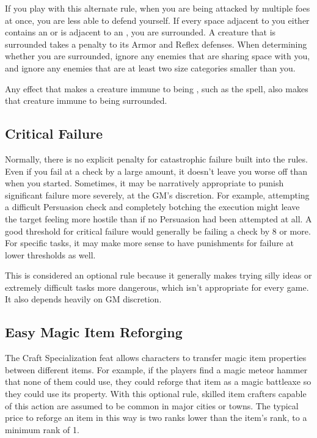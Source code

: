         If you play with this alternate rule, when you are being attacked by multiple foes at once, you are less able to defend yourself.
        If every space adjacent to you either contains an  or is adjacent to an , you are surrounded.
        A creature that is surrounded takes a  penalty to its Armor and Reflex defenses.
        When determining whether you are surrounded, ignore any enemies that are sharing space with you, and ignore any enemies that are at least two size categories smaller than you.

        Any effect that makes a creature immune to being \partiallyunaware, such as the  spell, also makes that creature immune to being surrounded.

    \subsection{Critical Failure}
        Normally, there is no explicit penalty for catastrophic failure built into the rules.
        Even if you fail at a check by a large amount, it doesn't leave you worse off than when you started.
        Sometimes, it may be narratively appropriate to punish significant failure more severely, at the GM's discretion.
        For example, attempting a difficult Persuasion check and completely botching the execution might leave the target feeling more hostile than if no Persuasion had been attempted at all.
        A good threshold for critical failure would generally be failing a check by 8 or more.
        For specific tasks, it may make more sense to have punishments for failure at lower thresholds as well.

        This is considered an optional rule because it generally makes trying silly ideas or extremely difficult tasks more dangerous, which isn't appropriate for every game.
        It also depends heavily on GM discretion.

    \subsection{Easy Magic Item Reforging}
        The Craft Specialization feat allows characters to transfer magic item properties between different items.
        For example, if the players find a magic meteor hammer that none of them could use, they could reforge that item as a magic battleaxe so they could use its property.
        With this optional rule, skilled item crafters capable of this action are assumed to be common in major cities or towns.
        The typical price to reforge an item in this way is two ranks lower than the item's rank, to a minimum rank of 1.

